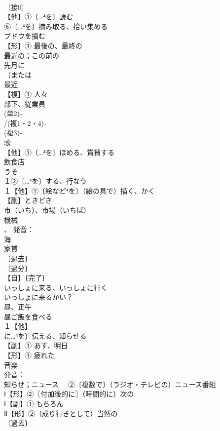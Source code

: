 \documentclass[8pt]{extreport}
\begin{document}
\begin{CJK}{UTF8}{min}
\\	〔接Ⅱ〕
\\	【他】①〔…⁴を〕読む 
\\	⑥〔…⁴を〕摘み取る、拾い集める　
\\	ブドウを摘む
\\	【形】① 最後の、最終の 
\\	最近の；この前の　　
\\	先月に 
\\	（または
\\	最近
\\	【複】① 人々 
\\	部下、従業員 
\\	(単2)‐
\\	/(複1・2・4)‐
\\	(複3)‐
\\	歌 
\\	【他】①〔…⁴を〕ほめる、賞賛する
\\	飲食店
\\	うそ 
\\	１②〔…⁴を〕する、行なう
\\	１【他】①〔絵など⁴を〕（絵の具で）描く、かく
\\	【副】ときどき 
\\	市（いち）、市場（いちば）
\\	機械 
\\	、 発音：
\\	海
\\	家賃 
\\	〔過去〕
\\	〔過分〕
\\	【自】〔完了〕
\\	いっしょに来る、いっしょに行く 
\\	いっしょに来るかい？
\\	昼、正午
\\	昼ご飯を食べる
\\	１【他】
\\	に…⁴を〕伝える、知らせる
\\	【副】① あす、明日
\\	【形】① 疲れた
\\	音楽　
\\	発音：
\\	知らせ；ニュース　 ②〔複数で〕（ラジオ・テレビの）ニュース番組
\\	Ⅰ【形】②〖付加後的に〗（時間的に）次の
\\	Ⅰ【副】① もちろん 
\\	Ⅱ【形】②（成り行きとして）当然の
\\	〔過去〕

\end{CJK}
\end{document}
